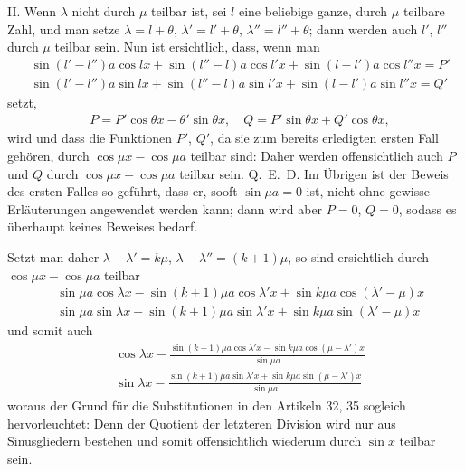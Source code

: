 II. Wenn $\lambda$ nicht durch $\mu$ teilbar ist, sei $l$ eine beliebige ganze, durch $\mu$ teilbare Zahl, und man setze $\lambda=l+\theta$, $\lambda'=l'+\theta$, $\lambda''=l''+\theta$; dann werden auch $l'$, $l''$ durch $\mu$ teilbar sein. Nun ist ersichtlich, dass, wenn man
\[
\begin{aligned}
&\sin(l'-l'')a\cos lx+\sin(l''-l)a\cos l'x+\sin(l-l')a\cos l''x=P'\\[5pt]
&\sin(l'-l'')a\sin lx+\sin(l''-l)a\sin l'x+\sin(l-l')a\sin l''x=Q'
\end{aligned}
\]
setzt,
\[
\begin{aligned}
&P=P'\cos\theta x-\theta'\sin\theta x,\quad Q=P'\sin\theta x+Q'\cos\theta x,
\end{aligned}
\]
wird und dass die Funktionen $P'$, $Q'$, da sie zum bereits erledigten ersten Fall gehören, durch $\cos\mu x-\cos\mu a$ teilbar sind: Daher werden offensichtlich auch $P$ und $Q$ durch $\cos\mu x-\cos\mu a$ teilbar sein. Q.~E.~D. Im Übrigen ist der Beweis des ersten Falles so geführt, dass er, sooft $\sin\mu a=0$ ist, nicht ohne gewisse Erläuterungen angewendet werden kann; dann wird aber $P=0$, $Q=0$, sodass es überhaupt keines Beweises bedarf.

Setzt man daher $\lambda-\lambda'=k\mu$, $\lambda-\lambda''=(k+1)\mu$, so sind ersichtlich durch $\cos\mu x-\cos\mu a$ teilbar
\[
\begin{aligned}
&\sin\mu a\cos\lambda x-\sin(k+1)\mu a\cos\lambda'x+\sin k\mu a\cos(\lambda'-\mu)x\\[5pt]
&\sin\mu a\sin\lambda x-\sin(k+1)\mu a\sin\lambda'x+\sin k\mu a\sin(\lambda'-\mu)x
\end{aligned}
\]
und somit auch
\[
\begin{aligned}
&\displaystyle\cos\lambda x-\frac{\sin(k+1)\mu a\cos\lambda'x-\sin k\mu a\cos(\mu-\lambda')x}{\sin\mu a}\\[5pt]
&\displaystyle\sin\lambda x-\frac{\sin(k+1)\mu a\sin\lambda'x+\sin k\mu a\sin(\mu-\lambda')x}{\sin\mu a}
\end{aligned}
\]
woraus der Grund für die Substitutionen in den Artikeln 32, 35 sogleich hervorleuchtet: Denn der Quotient der letzteren Division wird nur aus Sinusgliedern bestehen und somit offensichtlich wiederum durch $\sin x$ teilbar sein.

\endgroup
